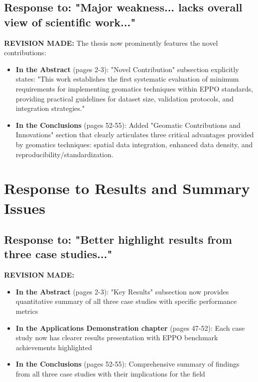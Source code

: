 \documentclass[11pt,a4paper]{article}
\begin{document}
\subsection{Response to: "Major weakness... lacks overall view of scientific work..."}

\textbf{REVISION MADE:} The thesis now prominently features the novel contributions:

\begin{itemize}
\item \textbf{In the Abstract} (pages 2-3): "Novel Contribution" subsection explicitly states: "This work establishes the first systematic evaluation of minimum requirements for implementing geomatics techniques within EPPO standards, providing practical guidelines for dataset size, validation protocols, and integration strategies."

\item \textbf{In the Conclusions} (pages 52-55): Added "Geomatic Contributions and Innovations" section that clearly articulates three critical advantages provided by geomatics techniques: spatial data integration, enhanced data density, and reproducibility/standardization.
\end{itemize}

\section{Response to Results and Summary Issues}

\subsection{Response to: "Better highlight results from three case studies..."}

\textbf{REVISION MADE:}

\begin{itemize}
\item \textbf{In the Abstract} (pages 2-3): "Key Results" subsection now provides quantitative summary of all three case studies with specific performance metrics
\item \textbf{In the Applications Demonstration chapter} (pages 47-52): Each case study now has clearer results presentation with EPPO benchmark achievements highlighted
\item \textbf{In the Conclusions} (pages 52-55): Comprehensive summary of findings from all three case studies with their implications for the field
\end{itemize}
\end{document}
